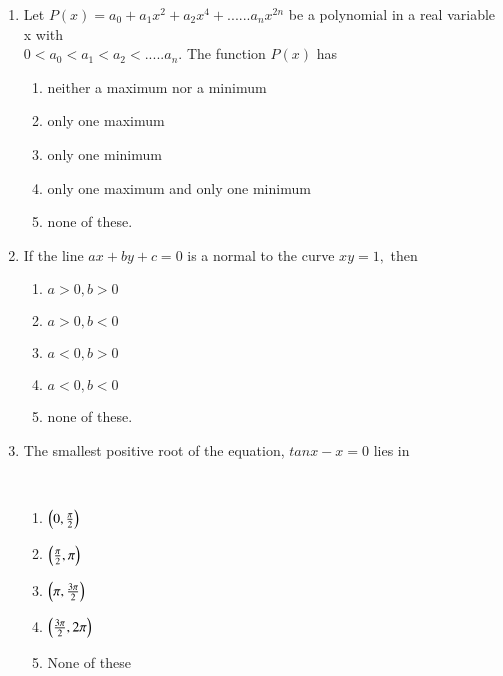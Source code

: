 \documentclass[journal,12pt,twocolumn]{IEEEtran}
\theoremstyle{remark}
\begin{document}
 \begin{enumerate}
     \item 
      Let $P(x) = a_0+ a_1x^2+a_2x^4+......a_nx^{2n}$ be a polynomial in a real variable x with \\
      $0<a_0<a_1<a_2<.....a_n.$ The function $P(x)$ has 
      \hfill{}
      \begin{enumerate}

         \item neither a maximum nor a minimum
 
         \item only one maximum

         \item only one minimum

         \item only one maximum and only one minimum
   
         \item none of these.\\

      \end{enumerate} 

      \item
       If the line $ax+by+c = 0$ is a normal to the curve $xy=1,$ then 
       \hfill{}\\
        \begin{enumerate}
         \item $a>0,b>0$ 
         \item $a>0,b<0$ 
         \item $a<0,b>0$
         \item $a<0,b<0$
         \item none of these.
       \end{enumerate}

      \item 
      The smallest positive root of the equation, $tanx-x=0$ lies in 
      \hfill{\\
      \begin{enumerate}
       \item $\left(0,\frac{\pi}{2}\right)$
       \item $\left(\frac{\pi}{2},\pi\right)$
       \item $\left(\pi,\frac{3\pi}{2}\right)$
       \item $\left(\frac{3\pi}{2},2\pi\right)$
       \item None of these\\
      \end{enumerate}

}
\end{enumerate}
\end{document}
